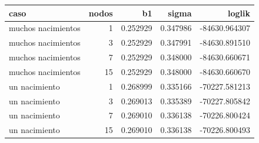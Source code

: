 \begin{tabular}{lrrrr}
\toprule
caso & nodos & b1 & sigma & loglik \\
\midrule
muchos nacimientos & 1 & 0.252929 & 0.347986 & -84630.964307 \\
muchos nacimientos & 3 & 0.252929 & 0.347991 & -84630.891510 \\
muchos nacimientos & 7 & 0.252929 & 0.348000 & -84630.660671 \\
muchos nacimientos & 15 & 0.252929 & 0.348000 & -84630.660670 \\
un nacimiento & 1 & 0.268999 & 0.335166 & -70227.581213 \\
un nacimiento & 3 & 0.269013 & 0.335389 & -70227.805842 \\
un nacimiento & 7 & 0.269010 & 0.336138 & -70226.800424 \\
un nacimiento & 15 & 0.269010 & 0.336138 & -70226.800493 \\
\bottomrule
\end{tabular}

